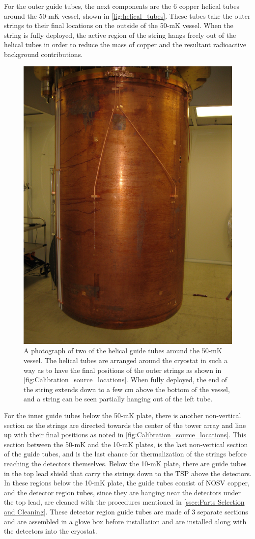 For the outer guide tubes, the next components are the 6 copper helical tubes around the 50-mK vessel, shown in \autoref{fig:helical_tubes}.
These tubes take the outer strings to their final locations on the outside of the 50-mK vessel.
When the string is fully deployed, the active region of the string hangs freely out of the helical tubes in order to reduce the mass of copper and the resultant radioactive background contributions.
\begin{figure}[htbp]
    \centering
    \includegraphics[height = 3.5 in]{Figures/HelicalTubes.jpg}
    \caption[A photograph of two of the helical guide tubes around the 50-mK vessel]
    {A photograph of two of the helical guide tubes around the 50-mK vessel.
    The helical tubes are arranged around the cryostat in such a way as to have the final positions of the outer strings as shown in \autoref{fig:Calibration_source_locations}.
    When fully deployed, the end of the string extends down to a few cm above the bottom of the vessel, and a string can be seen partially hanging out of the left tube.}
    \label{fig:helical_tubes}
\end{figure}

For the inner guide tubes below the 50-mK plate, there is another non-vertical section as the strings are directed towards the center of the tower array and line up with their final positions as noted in \autoref{fig:Calibration_source_locations}.
This section between the 50-mK and the 10-mK plates, is the last non-vertical section of the guide tubes, and is the last chance for thermalization of the strings before reaching the detectors themselves.
Below the 10-mK plate, there are guide tubes in the top lead shield that carry the strings down to the TSP above the detectors. 
In these regions below the 10-mK plate, the guide tubes consist of NOSV copper, and the detector region tubes, since they are hanging near the detectors under the top lead, are cleaned with the procedures mentioned in \autoref{ssec:Parts Selection and Cleaning}.
These detector region guide tubes are made of 3 separate sections and are assembled in a glove box before installation and are installed along with the detectors into the cryostat.

